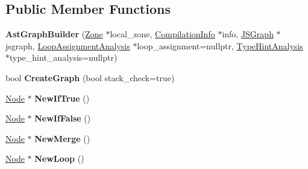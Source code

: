 \subsection*{Public Member Functions}
\begin{DoxyCompactItemize}
\item 
{\bfseries Ast\+Graph\+Builder} (\hyperlink{classv8_1_1internal_1_1_zone}{Zone} $\ast$local\+\_\+zone, \hyperlink{classv8_1_1internal_1_1_compilation_info}{Compilation\+Info} $\ast$info, \hyperlink{classv8_1_1internal_1_1compiler_1_1_j_s_graph}{J\+S\+Graph} $\ast$jsgraph, \hyperlink{classv8_1_1internal_1_1compiler_1_1_loop_assignment_analysis}{Loop\+Assignment\+Analysis} $\ast$loop\+\_\+assignment=nullptr, \hyperlink{classv8_1_1internal_1_1compiler_1_1_type_hint_analysis}{Type\+Hint\+Analysis} $\ast$type\+\_\+hint\+\_\+analysis=nullptr)\hypertarget{classv8_1_1internal_1_1compiler_1_1_ast_graph_builder_af055f098ea7e56c05164f1216bf7fee9}{}\label{classv8_1_1internal_1_1compiler_1_1_ast_graph_builder_af055f098ea7e56c05164f1216bf7fee9}

\item 
bool {\bfseries Create\+Graph} (bool stack\+\_\+check=true)\hypertarget{classv8_1_1internal_1_1compiler_1_1_ast_graph_builder_a649a4ddfa5224b4f9a149f6999f85ffe}{}\label{classv8_1_1internal_1_1compiler_1_1_ast_graph_builder_a649a4ddfa5224b4f9a149f6999f85ffe}

\item 
\hyperlink{classv8_1_1internal_1_1compiler_1_1_node}{Node} $\ast$ {\bfseries New\+If\+True} ()\hypertarget{classv8_1_1internal_1_1compiler_1_1_ast_graph_builder_aad3d06a4bda564f2e29313a379d69a8f}{}\label{classv8_1_1internal_1_1compiler_1_1_ast_graph_builder_aad3d06a4bda564f2e29313a379d69a8f}

\item 
\hyperlink{classv8_1_1internal_1_1compiler_1_1_node}{Node} $\ast$ {\bfseries New\+If\+False} ()\hypertarget{classv8_1_1internal_1_1compiler_1_1_ast_graph_builder_ad2b0a6bcb535a880913ec09880065f5e}{}\label{classv8_1_1internal_1_1compiler_1_1_ast_graph_builder_ad2b0a6bcb535a880913ec09880065f5e}

\item 
\hyperlink{classv8_1_1internal_1_1compiler_1_1_node}{Node} $\ast$ {\bfseries New\+Merge} ()\hypertarget{classv8_1_1internal_1_1compiler_1_1_ast_graph_builder_ae1904ae5249c4894a6521c742bb2678c}{}\label{classv8_1_1internal_1_1compiler_1_1_ast_graph_builder_ae1904ae5249c4894a6521c742bb2678c}

\item 
\hyperlink{classv8_1_1internal_1_1compiler_1_1_node}{Node} $\ast$ {\bfseries New\+Loop} ()\hypertarget{classv8_1_1internal_1_1compiler_1_1_ast_graph_builder_a1e1993c6bb53749afe2c8f7eca36797e}{}\label{classv8_1_1internal_1_1compiler_1_1_ast_graph_builder_a1e1993c6bb53749afe2c8f7eca36797e}


\end{DoxyCompactItemize}
